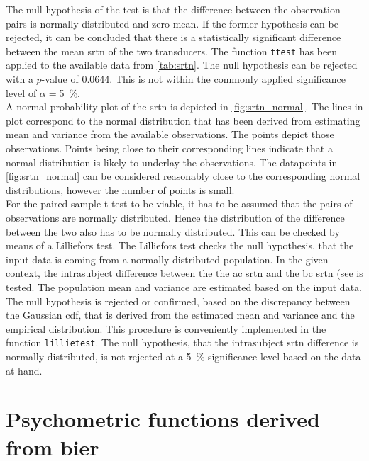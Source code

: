 The null hypothesis of the test is that the difference between the observation pairs is normally distributed and zero mean. If the former hypothesis can be rejected, it can be concluded that there is a statistically significant difference between the mean \gls{srtn} of the two transducers.
The \matlab function \texttt{ttest} has been applied to the available data from \autoref{tab:srtn}. The null hypothesis can be rejected with a $p$-value of 0.0644. This is not within the commonly applied significance level of $\alpha=$\SI{5}{\percent}.\\
A normal probability plot of the \gls{srtn} is depicted in \autoref{fig:srtn_normal}. The lines in plot correspond to the normal distribution that has been derived from estimating mean and variance from the available observations. 
The points depict those observations. Points being close to their corresponding lines indicate that a normal distribution is likely to underlay the observations. The datapoints in \autoref{fig:srtn_normal} can be considered reasonably close to the corresponding normal distributions, however the number of points is small.\\
For the paired-sample t-test to be viable, it has to be assumed that the pairs of observations are normally distributed. Hence the distribution of the difference between the two also has to be normally distributed. 
This can be checked by means of a Lilliefors test.
The Lilliefors test checks the null hypothesis, that the input data is coming from a normally distributed population. 
In the given context, the intrasubject difference between the the \gls{ac} \gls{srtn} and the \gls{bc} \gls{srtn} (see  is tested.
The population mean and variance are estimated based on the input data. The null hypothesis is rejected or confirmed, based on the discrepancy between the Gaussian \gls{cdf}, that is derived from the estimated mean and variance and the empirical distribution.
This procedure is conveniently implemented in the \matlab function \texttt{lillietest}.
The null hypothesis, that the intrasubject \gls{srtn} difference is normally distributed, is not rejected at a \SI{5}{\percent} significance level based on the data at hand.\\



\section{Psychometric functions derived from \gls{bier}}\label{sec:result_psycho}

